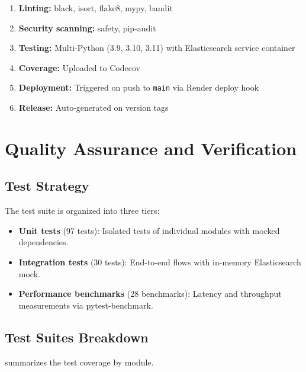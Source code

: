 \documentclass[11pt,a4paper]{article}
\begin{document}
\begin{enumerate}[leftmargin=*]
  \item \textbf{Linting:} black, isort, flake8, mypy, bandit
  \item \textbf{Security scanning:} safety, pip-audit
  \item \textbf{Testing:} Multi-Python (3.9, 3.10, 3.11) with Elasticsearch service container
  \item \textbf{Coverage:} Uploaded to Codecov
  \item \textbf{Deployment:} Triggered on push to \texttt{main} via Render deploy hook
  \item \textbf{Release:} Auto-generated on version tags
\end{enumerate}


\section{Quality Assurance and Verification}
\label{sec:quality}

\subsection{Test Strategy}
\label{subsec:test-strategy}

The test suite is organized into three tiers:

\begin{itemize}[leftmargin=*]
  \item \textbf{Unit tests} (97 tests): Isolated tests of individual modules with mocked dependencies.
  \item \textbf{Integration tests} (30 tests): End-to-end flows with in-memory Elasticsearch mock.
  \item \textbf{Performance benchmarks} (28 benchmarks): Latency and throughput measurements via pytest-benchmark.
\end{itemize}

\subsection{Test Suites Breakdown}
\label{subsec:test-breakdown}

 summarizes the test coverage by module.
\end{document}
